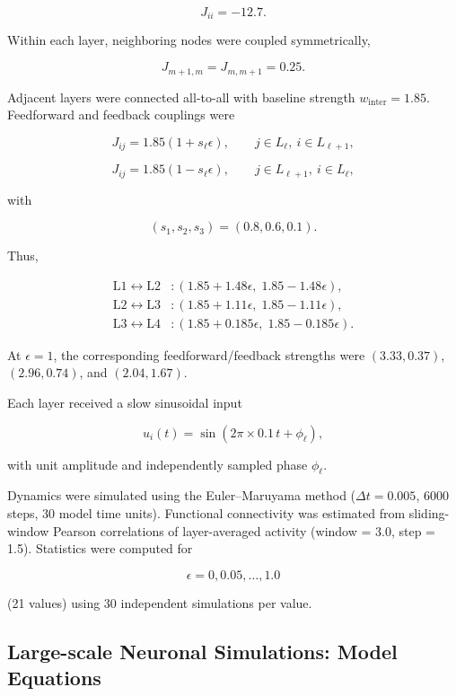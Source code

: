 \documentclass[9pt,twoside]{pnas-new}
\begin{document}
\[
J_{ii}=-12.7.
\]

Within each layer, neighboring nodes were coupled symmetrically,

\[
J_{m+1,m}=J_{m,m+1}=0.25.
\]

Adjacent layers were connected all-to-all with baseline strength
$w_{\mathrm{inter}}=1.85$. Feedforward and feedback couplings were

\[
J_{ij}
=
1.85(1+s_\ell\epsilon),
\qquad
j\in L_\ell,\ i\in L_{\ell+1},
\]

\[
J_{ij}
=
1.85(1-s_\ell\epsilon),
\qquad
j\in L_{\ell+1},\ i\in L_\ell,
\]

with

\[
(s_1,s_2,s_3)=(0.8,0.6,0.1).
\]

Thus,

\[
\begin{aligned}
\mathrm{L1}\leftrightarrow\mathrm{L2}&:
(1.85+1.48\epsilon,\;1.85-1.48\epsilon),\\
\mathrm{L2}\leftrightarrow\mathrm{L3}&:
(1.85+1.11\epsilon,\;1.85-1.11\epsilon),\\
\mathrm{L3}\leftrightarrow\mathrm{L4}&:
(1.85+0.185\epsilon,\;1.85-0.185\epsilon).
\end{aligned}
\]

At $\epsilon=1$, the corresponding feedforward/feedback strengths were
$(3.33,0.37)$, $(2.96,0.74)$, and $(2.04,1.67)$.

Each layer received a slow sinusoidal input

\[
u_i(t)=\sin(2\pi\times0.1\,t+\phi_\ell),
\]

with unit amplitude and independently sampled phase $\phi_\ell$.

Dynamics were simulated using the Euler--Maruyama method
($\Delta t=0.005$, 6000 steps, 30 model time units). Functional connectivity
was estimated from sliding-window Pearson correlations of layer-averaged
activity (window = 3.0, step = 1.5). Statistics were computed for

\[
\epsilon=0,0.05,\ldots,1.0
\]

(21 values) using 30 independent simulations per value.




\subsection*{Large-scale Neuronal Simulations: Model Equations}
\end{document}
